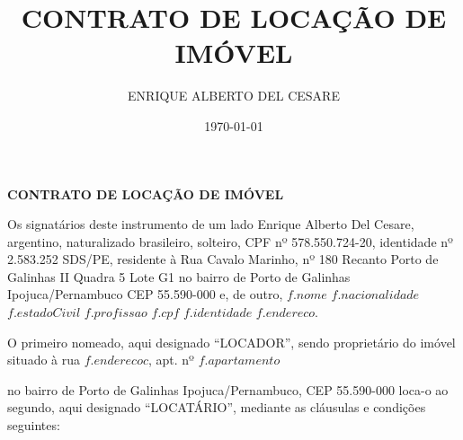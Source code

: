 \documentclass[a4paper,12pt]{article}
\date{\today}
\author{ENRIQUE ALBERTO DEL CESARE}
\title{CONTRATO DE LOCAÇÃO DE IMÓVEL}
\begin{document}
\thispagestyle{empty}
\begin{center}{\bf \huge CONTRATO DE LOCAÇÃO DE IMÓVEL}\\[4.0cm] \end{center}
\newcommand\n{\newcommand}


Os signatários deste  instrumento de um lado Enrique Alberto Del Cesare,
argentino, naturalizado brasileiro, solteiro, CPF nº 578.550.724-20, identidade nº 2.583.252 SDS\//PE,
residente à Rua Cavalo Marinho, nº 180 Recanto Porto de Galinhas II Quadra 5 Lote G1
no bairro de Porto de Galinhas Ipojuca/Pernambuco CEP 55.590-000 e, de outro,
${f.nome}$
${f.nacionalidade}$
${f.estadoCivil}$
${f.profissao}$
${f.cpf}$
${f.identidade}$
${f.endereco}$.

O primeiro nomeado, aqui designado “LOCADOR”, sendo proprietário do imóvel situado à rua ${f.enderecoc}$, apt. nº ${f.apartamento}$

no bairro de Porto de Galinhas Ipojuca\//Pernambuco, CEP 55.590-000 loca-o ao segundo, aqui designado “LOCATÁRIO”, mediante as cláusulas e condições seguintes:
\end{document}
